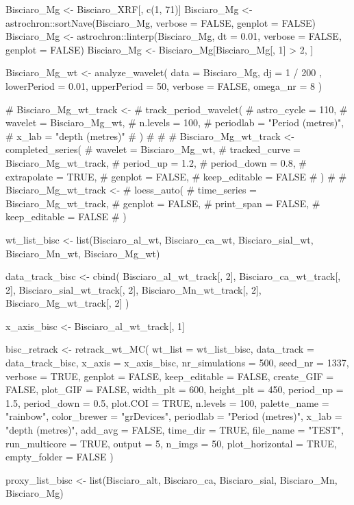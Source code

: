\documentclass[a4paper]{book}
\begin{document}
\begin{References}
Bisciaro\_Mg <- Bisciaro\_XRF[, c(1, 71)]
Bisciaro\_Mg <-
 astrochron::sortNave(Bisciaro\_Mg, verbose = FALSE, genplot = FALSE)
Bisciaro\_Mg <-
 astrochron::linterp(Bisciaro\_Mg,
                     dt = 0.01,
                     verbose = FALSE,
                     genplot = FALSE)
Bisciaro\_Mg <- Bisciaro\_Mg[Bisciaro\_Mg[, 1] > 2, ]

Bisciaro\_Mg\_wt <-
 analyze\_wavelet(
   data = Bisciaro\_Mg,
   dj = 1 / 200 ,
   lowerPeriod = 0.01,
   upperPeriod = 50,
   verbose = FALSE,
   omega\_nr = 8
 )

\# Bisciaro\_Mg\_wt\_track <-
\#   track\_period\_wavelet(
\#     astro\_cycle = 110,
\#     wavelet = Bisciaro\_Mg\_wt,
\#     n.levels = 100,
\#     periodlab = "Period (metres)",
\#     x\_lab = "depth (metres)"
\#   )
\#
\#
\# Bisciaro\_Mg\_wt\_track <- completed\_series(
\#   wavelet = Bisciaro\_Mg\_wt,
\#   tracked\_curve = Bisciaro\_Mg\_wt\_track,
\#   period\_up = 1.2,
\#   period\_down = 0.8,
\#   extrapolate = TRUE,
\#   genplot = FALSE,
\#   keep\_editable = FALSE
\# )
\#
\# Bisciaro\_Mg\_wt\_track <-
\#   loess\_auto(
\#     time\_series = Bisciaro\_Mg\_wt\_track,
\#     genplot = FALSE,
\#     print\_span = FALSE,
\#     keep\_editable = FALSE
\#   )




wt\_list\_bisc <- list(Bisciaro\_al\_wt,
                    Bisciaro\_ca\_wt,
                    Bisciaro\_sial\_wt,
                    Bisciaro\_Mn\_wt,
                    Bisciaro\_Mg\_wt)


data\_track\_bisc <- cbind(
 Bisciaro\_al\_wt\_track[, 2],
 Bisciaro\_ca\_wt\_track[, 2],
Bisciaro\_sial\_wt\_track[, 2],
 Bisciaro\_Mn\_wt\_track[, 2],
 Bisciaro\_Mg\_wt\_track[, 2]
)

x\_axis\_bisc <- Bisciaro\_al\_wt\_track[, 1]

bisc\_retrack <- retrack\_wt\_MC(
wt\_list = wt\_list\_bisc,
 data\_track = data\_track\_bisc,
 x\_axis = x\_axis\_bisc,
 nr\_simulations = 500,
 seed\_nr = 1337,
 verbose = TRUE,
 genplot = FALSE,
 keep\_editable = FALSE,
 create\_GIF = FALSE,
 plot\_GIF = FALSE,
 width\_plt =  600,
 height\_plt = 450,
 period\_up  =  1.5,
 period\_down = 0.5,
 plot.COI = TRUE,
 n.levels = 100,
 palette\_name = "rainbow",
 color\_brewer = "grDevices",
periodlab = "Period (metres)",
x\_lab = "depth (metres)",
add\_avg = FALSE,
time\_dir = TRUE,
file\_name = "TEST",
run\_multicore = TRUE,
output = 5,
 n\_imgs = 50,
 plot\_horizontal = TRUE,
 empty\_folder = FALSE
)

proxy\_list\_bisc <- list(Bisciaro\_alt,
                    Bisciaro\_ca,
                    Bisciaro\_sial,
                    Bisciaro\_Mn,
                    Bisciaro\_Mg)





\end{References}
\end{document}
